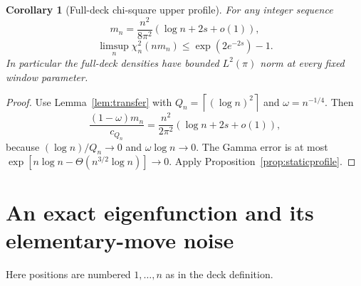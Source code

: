 \documentclass[11pt]{article}
\newtheorem{corollary}[theorem]{Corollary}
\theoremstyle{remark}
\newcommand{\ceil}[1]{\left\lceil #1\right\rceil}
\begin{document}
\begin{corollary}[Full-deck chi-square upper profile]\label{cor:L2}
For any integer sequence
\[
 m_n=\frac{n^2}{8\pi^2}(\log n+2s+o(1)),
\]
\begin{equation}\label{eq:chiupper}
 \limsup_n\chi_n^2(nm_n)\leq\exp(2e^{-2s})-1.
\end{equation}
In particular the full-deck densities have bounded $L^2(\pi)$ norm at every fixed window parameter.
\end{corollary}
\begin{proof}
Use Lemma~\ref{lem:transfer} with $Q_n=\ceil{(\log n)^2}$ and $\omega=n^{-1/4}$. Then
\[
 \frac{(1-\omega)m_n}{c_{Q_n}}
 =\frac{n^2}{2\pi^2}(\log n+2s+o(1)),
\]
because $(\log n)/Q_n\to0$ and $\omega\log n\to0$. The Gamma error is at most
$\exp[n\log n-\Theta(n^{3/2}\log n)]\to0$. Apply Proposition~\ref{prop:staticprofile}.
\end{proof}

\section{An exact eigenfunction and its elementary-move noise}\label{sec:eigen}
Here positions are numbered $1,\ldots,n$ as in the deck definition.
\end{document}
